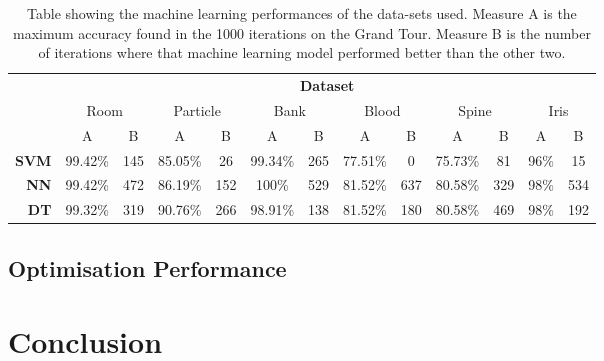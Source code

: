 \documentclass[a4paper,11pt,twoside]{article}
\begin{document}
\begin{table}[h]
\caption{Table showing the machine learning performances of the data-sets used. Measure A is the maximum accuracy found in the 1000 iterations on the Grand Tour. Measure B is the number of iterations where that machine learning model performed better than the other two.}
\begin{tabular}{r|c|c|c|c|c|c|c|c|c|c|c|c|} 
\cline{2-13}

\multicolumn{1}{l|}{}              & \multicolumn{12}{c|}{\textbf{Dataset}}                                                                                                                                      \\ \cline{2-13} 
\multicolumn{1}{l|}{}              & \multicolumn{2}{c|}{Room} & \multicolumn{2}{c|}{Particle} & \multicolumn{2}{c|}{Bank} & \multicolumn{2}{c|}{Blood} & \multicolumn{2}{c|}{Spine} & \multicolumn{2}{c|}{Iris} \\ \cline{2-13} 
                                   & A             & B         & A               & B           & A             & B         & A              & B         & A              & B         & A            & B          \\ \hline
\multicolumn{1}{|r|}{\textbf{SVM}} & 99.42\%       & 145       & 85.05\%         & 26          & 99.34\%       & 265       & 77.51\%        & 0         & 75.73\%        & 81        & 96\%         & 15         \\ \hline
\multicolumn{1}{|r|}{\textbf{NN}}  & 99.42\%       & 472       & 86.19\%         & 152         & 100\%         & 529       & 81.52\%        & 637       & 80.58\%        & 329       & 98\%         & 534        \\ \hline
\multicolumn{1}{|r|}{\textbf{DT}}  & 99.32\%       & 319       & 90.76\%         & 266         & 98.91\%       & 138       & 81.52\%        & 180       & 80.58\%        & 469       & 98\%         & 192        \\ \hline

\end{tabular}

\end{table}




\newpage
\subsection{Optimisation Performance}
\newpage
\section{Conclusion}
\end{document}
